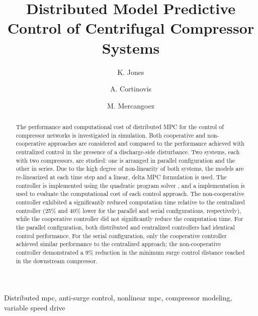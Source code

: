\documentclass{ifacconf}
\begin{document}
\begin{frontmatter}

\title{Distributed Model Predictive Control of Centrifugal Compressor Systems} 


\author[First]{K. Jones} 
\author[First]{A. Cortinovis} 
\author[First]{M. Mercangoez}

\address[First]{ABB Switzerland Ltd., Corporate Research, Baden-Dättwil, Switzerland (e-mail: katie.jones@reactive-robotics.com, andrea.cortinovis@ch.abb.com, mehmet.mercangoez@ch.abb.com).}

\begin{abstract}                %
The performance and computational cost of distributed MPC for the control of compressor networks is investigated in simulation.
Both cooperative and non-cooperative approaches are considered and compared to the performance achieved with centralized control in the presence of a discharge-side disturbance.
Two systems, each with two compressors, are studied: one is arranged in parallel configuration and the other in series.
Due to the high degree of non-linearity of both systems, the models are re-linearized at each time step and a linear, delta MPC formulation is used.
The controller is implemented using the quadratic program solver \qpoases{}, and a \cpp{} implementation is used to evaluate the computational cost of each control approach.
The non-cooperative controller exhibited a significantly reduced computation time relative to the centralized controller (25\% and 40\% lower for the parallel and serial configurations, respectively), while the cooperative controller did not significantly reduce the computation time.
For the parallel configuration, both distributed and centralized controllers had identical control performance.
For the serial configuration, only the cooperative controller achieved similar performance to the centralized approach; the non-cooperative controller demonstrated a 9\% reduction in the minimum surge control distance reached in the downstream compressor.
\end{abstract}

\begin{keyword}
  Distributed mpc, anti-surge control, nonlinear mpc, compressor modeling, variable speed drive
\end{keyword}

\end{frontmatter}
\end{document}
